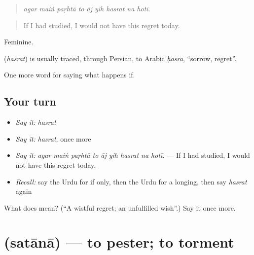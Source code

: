 \begin{quote}
        
\end{quote}

\begin{quote}
\emph{agar maiṅ paṛhtā to āj yih hasrat na hotī.}
\end{quote}

\begin{quote}
If I had studied, I would not have this regret today.
\end{quote}

Feminine.

\begin{cousinweb}
\textbf{} (\emph{hasrat}) is usually traced, through Persian, to Arabic \emph{ḥasra}, \textquotedblleft{}sorrow, regret\textquotedblright{}.
\end{cousinweb}

\begin{grammarlens}[title={What you've built}]
One more word for saying what happens if.
\end{grammarlens}

\subsection*{Your turn}
\begin{itemize}
\raggedright
  \item \emph{Say it:} \emph{hasrat}
  \item \emph{Say it:} \emph{hasrat}, once more
  \item \emph{Say it:} \emph{agar maiṅ paṛhtā to āj yih hasrat na hotī.} — If I had studied, I would not have this regret today.
  \item \emph{Recall:} say the Urdu for if only, then the Urdu for a longing, then say \emph{hasrat} again
\end{itemize}

\begin{tcolorbox}[breakable,colback=teal!4,colframe=teal!35!black,title={Before you move on}]
What does  mean? (\textquotedblleft{}A wistful regret; an unfulfilled wish\textquotedblright{}.) Say it once more.
\end{tcolorbox}
\section[\texorpdfstring{\ur{ستانا} (satānā)}{ستانا (satānā)}]{ (satānā) — to pester; to torment}

